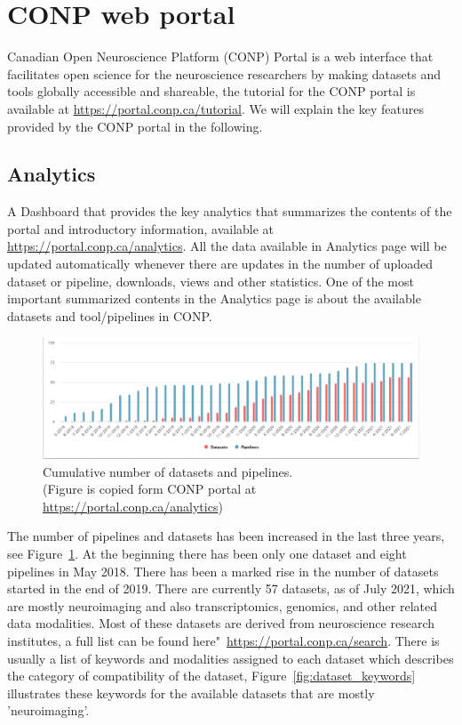  









\section{CONP web portal}

Canadian Open Neuroscience Platform (CONP) Portal is a web interface that facilitates open science for the neuroscience researchers by making datasets and tools globally accessible and shareable, the tutorial for the CONP portal is available at \url{https://portal.conp.ca/tutorial}. We will explain the key features provided by the CONP portal in the following. 

\subsection{Analytics}
A Dashboard that provides the key analytics that summarizes the  contents of the portal and introductory information, available at \url{https://portal.conp.ca/analytics}. All the data available in Analytics page will be updated automatically whenever there are updates in the number of uploaded dataset or pipeline, downloads, views and other statistics. One of the most important summarized contents in the Analytics page is about the available datasets and tool/pipelines in CONP.

\begin{figure}[ht]
  \centering
  \includegraphics[width=\textwidth,height=\textheight,keepaspectratio]{figures/PipeDataTime.png}
  \caption{Cumulative number of datasets and pipelines. \\(Figure is copied form CONP portal at \url{https://portal.conp.ca/analytics})}
  \label{fig:cumulative}
  \end{figure}

The number of pipelines and datasets has been increased in the last three years, see Figure~\ref{fig:cumulative}. At the beginning there has been only one dataset and eight pipelines in May 2018. There has been a marked rise in the number of datasets started in the end of 2019.
There are currently 57 datasets, as of July 2021, which are mostly neuroimaging and also transcriptomics, genomics, and other related data modalities. Most of these datasets are derived from neuroscience research institutes, a full list can be found here"~\url{https://portal.conp.ca/search}. There is usually a list of keywords and modalities assigned to each dataset which describes the category of compatibility of the dataset, Figure~\ref{fig:dataset_keywords} illustrates these keywords for the available datasets that are mostly 'neuroimaging'. 

